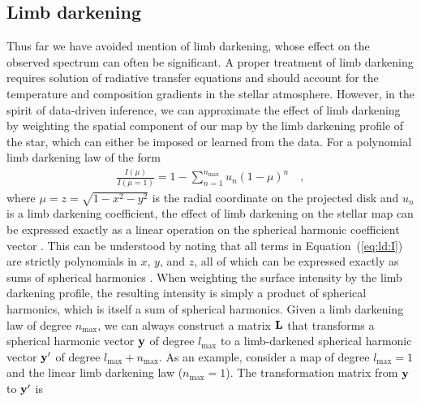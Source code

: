 \documentclass[modern]{aastex631}
\begin{document}
\subsection{Limb darkening}
\label{sec:ld}
%
Thus far we have avoided mention of limb darkening, whose effect on the observed spectrum can often be significant. 
A proper treatment of limb darkening requires solution of radiative transfer equations and should account for the temperature and composition gradients in the stellar atmosphere. 
However, in the spirit of data-driven inference, we can approximate the effect of limb darkening by weighting the spatial component of our map by the limb darkening profile of the star, which can either be imposed or learned from the data. 
For a polynomial limb darkening law of the form
%
\begin{align}
    \label{eq:ld:I}
    \frac{I(\mu)}{I(\mu = 1)} = 1 - \sum_{n=1}^{n_\mathrm{max}} u_n(1 - \mu)^n
    \quad,
\end{align}
%
where $\mu = z = \sqrt{1 - x^2 - y^2}$ is the radial coordinate on the projected disk and $u_n$ is a limb darkening coefficient, the effect of limb darkening on the stellar map can be expressed exactly as a linear operation on the spherical harmonic coefficient vector \citep{Luger2019,Agol2020}. 
This can be understood by noting that all terms in Equation~(\ref{eq:ld:I}) are strictly polynomials in $x$, $y$, and $z$, all of which can be expressed exactly as sums of spherical harmonics \citep{Luger2019}. 
When weighting the surface intensity by the limb darkening profile, the resulting intensity is simply a product of spherical harmonics, which is itself a sum of spherical harmonics. 
Given a limb darkening law of degree $n_\mathrm{max}$, we can always construct a matrix ${\mathbf{L}}$ that transforms a spherical harmonic vector ${\mathbf{y}}$ of degree $l_\mathrm{max}$ to a limb-darkened spherical harmonic vector ${\mathbf{y'}}$ of degree $l_\mathrm{max} + n_\mathrm{max}$. 
As an example, consider a map of degree $l_\mathrm{max} = 1$ and the linear limb darkening law ($n_\mathrm{max} = 1$).
The transformation matrix from ${\mathbf{y}}$ to ${\mathbf{y'}}$ is
%
\end{document}
